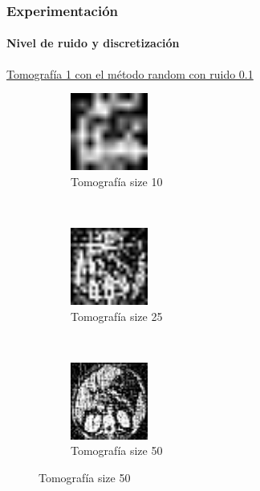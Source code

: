 \documentclass{beamer}
\begin{document}
\begin{frame}
  \frametitle{Experimentación}
  \framesubtitle{Nivel de ruido y discretización}
  \underline{Tomografía 1 con el método random con ruido 0.1}
  \begin{figure}[H]
    \centering
      \begin{subfigure}[t]{0.3\textwidth}
          \centering
          \includegraphics[height=1.0in]{imagenes/noise/1.png}
          \caption{Tomografía size 10}
      \end{subfigure}
      ~ 
      \begin{subfigure}[t]{0.3\textwidth}
          \centering
          \includegraphics[height=1.0in]{imagenes/noise/2.png}
          \caption{Tomografía size 25}
      \end{subfigure}
      ~ 
      \begin{subfigure}[t]{0.3\textwidth}
          \centering
          \includegraphics[height=1.0in]{imagenes/noise/3.png}
          \caption{Tomografía size 50}
      \end{subfigure}
  \end{figure}
\end{frame}

\end{document}
